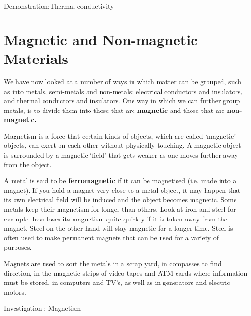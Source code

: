 \begin{gexperiment}{Demonstration:Thermal conductivity}
            \section{Magnetic and Non-magnetic Materials}
            \nopagebreak
      \label{m38706*id67151}We have now looked at a number of ways in which matter can be grouped, such as into metals, semi-metals and non-metals; electrical conductors and insulators, and thermal conductors and insulators. One way in which we can further group metals, is to divide them into those that are \textbf{magnetic} and those that are \textbf{non-magnetic.}\par 
\par
\Definition{   \label{id2410309} { Magnetism }} { \label{m38706*meaningfhsst!!!underscore!!!id570}
      \label{m38706*id67174}Magnetism is a force that certain kinds of objects, which are called `magnetic' objects, can exert on each other without physically touching. A magnetic object is surrounded by a magnetic `field' that gets weaker as one moves further away from the object. \par 
       } 
      \label{m38706*id67186}A metal is said to be \textbf{ferromagnetic} if it can be magnetised (i.e. made into a magnet). If you hold a magnet very close to a metal object, it may happen that its own electrical field will be induced and the object becomes magnetic. Some metals keep their magnetism for longer than others. Look at iron and steel for example. Iron loses its magnetism quite quickly if it is taken away from the magnet. Steel on the other hand will stay magnetic for a longer time. Steel is often used to make permanent magnets that can be used for a variety of purposes.\par 
      \label{m38706*id67200}Magnets are used to sort the metals in a scrap yard, in compasses to find direction, in the magnetic strips of video tapes and ATM cards where information must be stored, in computers and TV's, as well as in generators and electric motors.\par 
\label{m38706*secfhsst!!!underscore!!!id575}
            \begin{gexperiment}{Investigation : Magnetism}{
}
\end{gexperiment}
\end{gexperiment}

